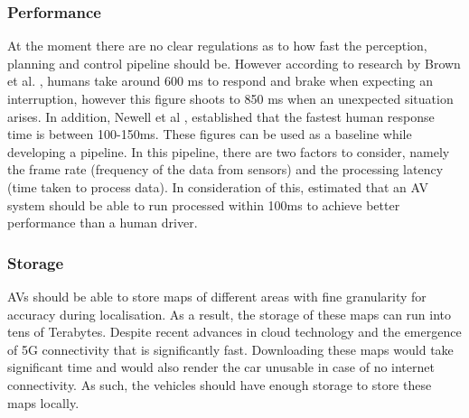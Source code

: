 \subsubsection*{Performance} 
At the moment there are no clear regulations as to how fast the perception, planning and control pipeline should be. However according to research by Brown et al. \cite{brown1994human}, humans take around 600 ms to respond and brake when expecting an interruption, however this figure shoots to 850 ms when an unexpected situation arises. In addition, Newell et al \cite{newell1985prospects}, established that the fastest human response time is between 100-150ms. These figures can be used as a baseline while developing a pipeline. In this pipeline, there are two factors to consider, namely the frame rate (frequency of the data from sensors) and the processing latency (time taken to process data). In consideration of this, \cite{lin2018architectural} estimated that an AV system should be able to run processed within 100ms to achieve better performance than a human driver. 

\subsubsection*{Storage} 
AVs should be able to store maps of different areas with fine granularity for accuracy during localisation. As a result, the storage of these maps can run into tens of Terabytes. Despite recent advances in cloud technology and the emergence of 5G connectivity that is significantly fast. Downloading these maps would take significant time and would also render the car unusable in case of no internet connectivity. As such, the vehicles should have enough storage to store these maps locally. 

